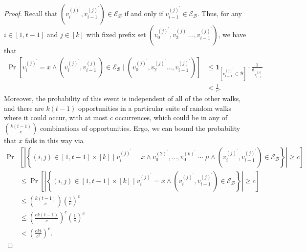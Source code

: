 \documentclass{report}
\begin{document}
\begin{proof}
Recall that $\left ( v_i^{(j)^\prime}, v_{i-1}^{(j)^\prime} \right ) \in \mathcal{E}_\mathcal{B}$ if and only if $v_{i-1}^{(j)^\prime} \in \mathcal{E}_\mathcal{B}$.
Thus, for any $i \in [1, t-1]$ and $j \in [k]$ with fixed prefix set 
$\left (v_0^{(j)^\prime}, v_2^{(j)^\prime} \dots, v_{i-1}^{(j)^\prime} \right )$,
we have that 
%
\begin{align*}
\Pr \left [ 
		v_i^{(j)^\prime} = x \wedge 
		\left ( v_i^{(j)^\prime}, v_{i-1}^{(j)^\prime} \right ) \in \mathcal{E}_\mathcal{B} 
				\mid \left (v_0^{(j)^\prime}, v_2^{(j)^\prime} \dots, v_{i-1}^{(j)^\prime} \right )
\right ]
&\leq
\mathbf{1}_{\left [ v_{i-1}^{(j)^\prime} \in \mathcal{B} \right ]} \cdot \frac{1}{\mathbf{d}_{v_{i-1}^{(j)^\prime}}}
\\
&<
\frac{1}{c}.
\end{align*}
%
Moreover, the probability of this event is independent of all of the other walks, and there are $k(t-1)$ opportunities in a particular suite of random walks where it could occur, with at most $c$ occurrences, which could be in any of ${k(t-1) \choose c}$ combinations of opportunities. 
Ergo, we can bound the probability that $x$ fails in this way via 
\begin{align*}
\Pr &\left [
	\left | \left \{ 
		(i,j) \in [1, t-1] \times [k] 
			\mid v_{i}^{(j)^\prime} = x 
			\wedge v_0^{(2)^\prime}, \dots, v_0^{(k)^\prime} \sim \mu
			\wedge \left ( v_{i}^{(j)^\prime}, v_{i - 1}^{(j)^\prime} \right ) \in \mathcal{E}_\mathcal{B}
	\right \} \right | \geq c
\right ]	
\\
&\leq
\Pr \left [
	\left | \left \{ 
		(i,j) \in [1, t-1] \times [k] 
			\mid v_{i}^{(j)^\prime} = x 
			\wedge \left ( v_{i}^{(j)^\prime}, v_{i - 1}^{(j)^\prime} \right ) \in \mathcal{E}_\mathcal{B}
	\right \} \right | \geq c
\right ]	
\\
&\leq 
{k(t -1) \choose c} \left ( \frac{1}{c} \right )^c
\\
&\leq 
\left ( \frac{ek(t-1)}{c} \right )^c \left ( \frac{1}{c} \right )^c
\\
&< 
\left ( \frac{ekt}{c^2} \right )^c.
\end{align*}
%


\end{proof}
\end{document}
